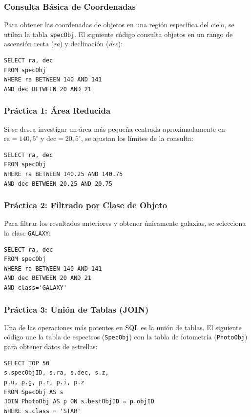 \subsubsection{Consulta Básica de Coordenadas}
Para obtener las coordenadas de objetos en una región específica del cielo, se utiliza la tabla \texttt{specObj}. El siguiente código consulta objetos en un rango de ascensión recta (\textit{ra}) y declinación (\textit{dec}):

\begin{verbatim}
SELECT ra, dec 
FROM specObj 
WHERE ra BETWEEN 140 AND 141 
AND dec BETWEEN 20 AND 21
\end{verbatim}

\subsubsection{Práctica 1: Área Reducida}
Si se desea investigar un área más pequeña centrada aproximadamente en $\mathrm{ra}=140{,}5^\circ$ y $\mathrm{dec}=20{,}5^\circ$, se ajustan los límites de la consulta:

\begin{verbatim}
SELECT ra, dec 
FROM specObj 
WHERE ra BETWEEN 140.25 AND 140.75 
AND dec BETWEEN 20.25 AND 20.75
\end{verbatim}

\subsubsection{Práctica 2: Filtrado por Clase de Objeto}
Para filtrar los resultados anteriores y obtener únicamente galaxias, se selecciona la clase \texttt{GALAXY}:

\begin{verbatim}
SELECT ra, dec 
FROM specObj 
WHERE ra BETWEEN 140 AND 141 
AND dec BETWEEN 20 AND 21 
AND class='GALAXY'
\end{verbatim}

\subsubsection{Práctica 3: Unión de Tablas (JOIN)}
Una de las operaciones más potentes en SQL es la unión de tablas. El siguiente código une la tabla de espectros (\texttt{SpecObj}) con la tabla de fotometría (\texttt{PhotoObj}) para obtener datos de estrellas:

\begin{verbatim}
SELECT TOP 50 
s.specObjID, s.ra, s.dec, s.z, 
p.u, p.g, p.r, p.i, p.z 
FROM SpecObj AS s 
JOIN PhotoObj AS p ON s.bestObjID = p.objID 
WHERE s.class = 'STAR'
\end{verbatim}

